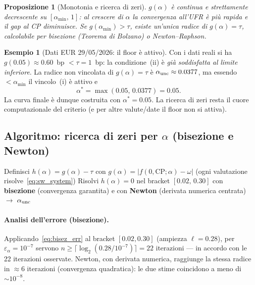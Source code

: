 \documentclass[11pt,a4paper]{article}
\theoremstyle{plain}
\newtheorem{proposizione}[teorema]{Proposizione}
\theoremstyle{definition}
\newtheorem{esempio}[teorema]{Esempio}
\theoremstyle{remark}
\newcommand{\CP}{\ensuremath{\mathrm{CP}}}
\newcommand{\abs}[1]{\left\lvert #1 \right\rvert}
\begin{document}
\begin{proposizione}[Monotonia e ricerca di zeri]
$g(\alpha)$ \`e continua e strettamente decrescente su $[\alpha_{\min},\,1]$:
al crescere di $\alpha$ la convergenza all'UFR è più rapida e il gap al CP
diminuisce. Se $g(\alpha_{\min})>\tau$, esiste un'unica radice di $g(\alpha)=\tau$,
calcolabile per bisezione (Teorema di Bolzano) o Newton--Raphson.
\end{proposizione}

\begin{esempio}[Dati EUR 29/05/2026: il floor è attivo]
Con i dati reali si ha $g(0.05)\approx 0.60$~bp $<\tau=1$~bp: la condizione~(ii) è
\emph{già soddisfatta al limite inferiore}. La radice non vincolata di
$g(\alpha)=\tau$ è $\alpha_{\rm unc}\approx 0.0377$, ma essendo $<\alpha_{\min}$ il
vincolo~(i) è attivo e
\[
  \boxed{\;\alpha^* = \max(0.05,\,0.0377) = 0.05.\;}
\]
La curva finale è dunque costruita con $\alpha^*=0.05$. La ricerca di zeri resta il
cuore computazionale del criterio (e per altre valute/date il floor non si attiva).
\end{esempio}

\subsection{Algoritmo: ricerca di zeri per $\alpha$ (bisezione e Newton)}

\begin{algorithm}[H]
\caption{Determinazione di $\alpha^*$ (criterio sez.~9.14)}
\label{alg:alpha}
\DontPrintSemicolon
{}
\Input{$\{T_k\}$, $\{r_k\}$, $\omega$, $\CP$, $\tau=10^{-4}$, $\alpha_{\min}=0.05$}
Definisci $h(\alpha) = g(\alpha) - \tau$ con $g(\alpha)=\abs{f(0,\CP;\alpha)-\omega}$
(ogni valutazione risolve~\eqref{eq:sw_system})\;
Risolvi $h(\alpha)=0$ nel bracket $[0.02,\,0.30]$ con \textbf{bisezione}
(convergenza garantita) e con \textbf{Newton} (derivata numerica centrata)
$\longrightarrow$ $\alpha_{\rm unc}$\;
\;
\end{algorithm}

\paragraph{Analisi dell'errore (bisezione).} Applicando~\eqref{eq:bisez_err} al
bracket $[0.02,0.30]$ (ampiezza $\ell=0.28$), per $\varepsilon_\alpha=10^{-7}$
servono $n \ge \lceil\log_2(0.28/10^{-7})\rceil = 22$ iterazioni --- in accordo con
le 22 iterazioni osservate. Newton, con derivata numerica, raggiunge la stessa
radice in $\approx 6$ iterazioni (convergenza quadratica): le due stime coincidono
a meno di $\sim 10^{-8}$.
\end{document}
